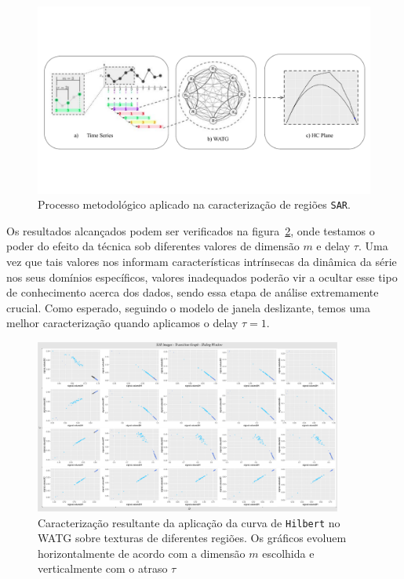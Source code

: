 \documentclass[12pt]{article}
\begin{document}
\begin{figure}[hbt]
	\centering
	\vspace{-0.5cm}
	\includegraphics[scale = 0.6]{Figures/WATG.pdf}
	\vspace{-2.5cm}
    \caption{Processo metodológico aplicado na caracterização de regiões \texttt{SAR}.}
    \label{fig:WATG}
\end{figure}

Os resultados alcançados podem ser verificados na figura~\ref{fig:Regions}, onde testamos o poder do efeito da técnica sob diferentes valores de dimensão $m$ e delay $\tau$.
Uma vez que tais valores nos informam características intrínsecas da dinâmica da série nos seus domínios específicos, valores inadequados poderão vir a ocultar esse tipo de conhecimento acerca dos dados, sendo essa etapa de análise extremamente crucial. 
Como esperado, seguindo o modelo de janela deslizante, temos uma melhor caracterização quando aplicamos o delay $\tau = 1$.

\begin{figure}[hbt]
	\centering
	\includegraphics[width=0.9\textwidth]{Figures/transitionGraphHilbert.png}
    \caption{Caracterização resultante da aplicação da curva de \texttt{Hilbert} no WATG sobre texturas de diferentes regiões. Os gráficos evoluem horizontalmente de acordo com a dimensão $m$ escolhida e verticalmente com o atraso $\tau$}
    \label{fig:Regions}
\end{figure}
\end{document}
